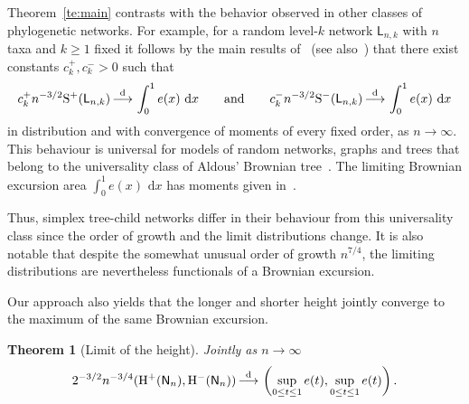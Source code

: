 \documentclass[english,11pt]{smfart}
\newcommand{\convdis}{\,{\buildrel \mathrm{d} \over \longrightarrow}\,}
\newcommand{\He}{\mathrm{H}}
\newcommand{\Si}{\mathrm{S}}
\newcommand{\mL}{\mathsf{L}}
\newcommand{\mN}{\mathsf{N}}
\newtheorem{theorem}{Theorem}[section]
\numberwithin{equation}{section}
\begin{document}
Theorem~\ref{te:main} contrasts with the behavior observed in other classes of phylogenetic networks. For example, for a random level-$k$ network $\mL_{n,k}$ with $n$ taxa and $k \ge 1$ fixed it follows by the main results of~\cite{zbMATH07751083} (see also~\cite{zbMATH08019266}) that there exist constants $c_k^+, c_k^->0$ such that
\[
c_k^+ n^{-3/2} \Si^+(\mL_{n,k}) \convdis \int_{0}^1 e(x)\,\,\mathrm{d}x
\qquad \text{and} \qquad 
c_k^- n^{-3/2} \Si^-(\mL_{n,k}) \convdis \int_{0}^1 e(x)\,\,\mathrm{d}x
\]
in distribution and with convergence of moments of every fixed order, as $n \to \infty$. This behaviour is universal for models of random networks, graphs and trees that belong to the universality class of Aldous' Brownian tree~\cite{MR1085326,MR1166406,MR1207226}. The limiting Brownian excursion area $\int_{0}^1 e(x)\,\,\mathrm{d}x$ has moments given in~\cite{zbMATH05728597}. 

Thus, simplex tree-child networks differ in their behaviour from this universality class since  the order of growth and the limit distributions change.  It is also notable that despite the somewhat unusual order of growth $n^{7/4}$, the limiting distributions are nevertheless functionals of a Brownian excursion.

Our approach also yields that the longer and shorter height jointly converge to the maximum of the same Brownian excursion.
\begin{theorem}[Limit of the height]
	\label{te:main2}
	Jointly as $n \to \infty$
	\begin{align*}
		2^{-3/2} n^{-3/4} (\He^+(\mN_n),\He^-(\mN_n)) \convdis \left(\sup_{0 \le t \le 1} e(t), \sup_{0 \le t \le 1} e(t)\right).
	\end{align*}
\end{theorem}
\end{document}
